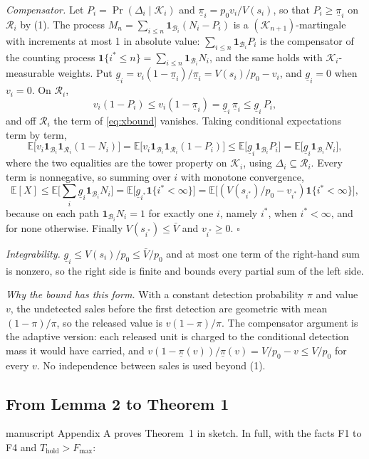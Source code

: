 \documentclass[10pt,a4paper]{article}
\newcommand{\Thold}{T_{\mathrm{hold}}}
\newcommand{\Fmax}{F_{\max}}
\newcommand{\E}{\mathbb{E}}
\newcommand{\ist}{i^{*}}
\newcommand{\cK}{\mathcal{K}}
\newcommand{\cR}{\mathcal{R}}
\newcommand{\cB}{\mathcal{B}}
\newcommand{\one}{\mathbf{1}}
\theoremstyle{plain}
\theoremstyle{remark}
\begin{document}
\emph{Compensator.} Let $P_i=\Pr(\Delta_i\mid\cK_i)$ and $\underline\pi_i=p_0v_i/V(s_i)$, so that $P_i\ge\underline\pi_i$ on $\cR_i$ by (1). The process $M_n=\sum_{i\le n}\one_{\cB_i}(N_i-P_i)$ is a $(\cK_{n+1})$-martingale with increments at most 1 in absolute value: $\sum_{i\le n}\one_{\cB_i}P_i$ is the compensator of the counting process $\one\{\ist\le n\}=\sum_{i\le n}\one_{\cB_i}N_i$, and the same holds with $\cK_i$-measurable weights. Put $\underline g_i=v_i(1-\underline\pi_i)/\underline\pi_i=V(s_i)/p_0-v_i$, and $\underline g_i=0$ when $v_i=0$. On $\cR_i$,
\[
v_i(1-P_i)\le v_i(1-\underline\pi_i)=\underline g_i\,\underline\pi_i\le\underline g_i\,P_i ,
\]
and off $\cR_i$ the term of \eqref{eq:xbound} vanishes. Taking conditional expectations term by term,
\[
\E\big[v_i\one_{\cB_i}\one_{\cR_i}(1-N_i)\big]=\E\big[v_i\one_{\cB_i}\one_{\cR_i}(1-P_i)\big]\le\E\big[\underline g_i\one_{\cB_i}P_i\big]=\E\big[\underline g_i\one_{\cB_i}N_i\big],
\]
where the two equalities are the tower property on $\cK_i$, using $\Delta_i\subseteq\cR_i$. Every term is nonnegative, so summing over $i$ with monotone convergence,
\[
\E[X]\le\E\Big[\sum_i\underline g_i\one_{\cB_i}N_i\Big]=\E\big[\underline g_{\ist}\one\{\ist<\infty\}\big]=\E\big[(V(s_{\ist})/p_0-v_{\ist})\one\{\ist<\infty\}\big],
\]
because on each path $\one_{\cB_i}N_i=1$ for exactly one $i$, namely $\ist$, when $\ist<\infty$, and for none otherwise. Finally $V(s_{\ist})\le\bar V$ and $v_{\ist}\ge0$. \hfill$\square$

\emph{Integrability.} $\underline g_i\le V(s_i)/p_0\le\bar V/p_0$ and at most one term of the right-hand sum is nonzero, so the right side is finite and bounds every partial sum of the left side.

\emph{Why the bound has this form.} With a constant detection probability $\pi$ and value $v$, the undetected sales before the first detection are geometric with mean $(1-\pi)/\pi$, so the released value is $v(1-\pi)/\pi$. The compensator argument is the adaptive version: each released unit is charged to the conditional detection mass it would have carried, and $v(1-\underline\pi(v))/\underline\pi(v)=V/p_0-v\le V/p_0$ for every $v$. No independence between sales is used beyond (1).

\subsection{From Lemma 2 to Theorem 1}

manuscript Appendix A proves Theorem~1 in sketch. In full, with the facts F1 to F4 and $\Thold>\Fmax$:
\end{document}
